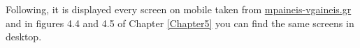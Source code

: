 Following, it is displayed every screen on mobile taken from \url{mpaineis-vgaineis.gr} and in figures 4.4 and 4.5 of Chapter \ref{Chapter5} you can find the same screens in desktop.
\begin{figure}[H]
	\centering
	\qquad

\end{figure}
